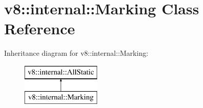 \hypertarget{classv8_1_1internal_1_1_marking}{}\section{v8\+:\+:internal\+:\+:Marking Class Reference}
\label{classv8_1_1internal_1_1_marking}
Inheritance diagram for v8\+:\+:internal\+:\+:Marking\+:\begin{figure}[H]
\begin{center}
\leavevmode
\includegraphics[height=2.000000cm]{classv8_1_1internal_1_1_marking}
\end{center}
\end{figure}
